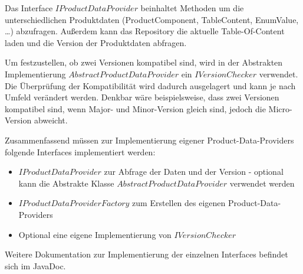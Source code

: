 \documentclass[headsepline=true, footsepline=true]{scrartcl}
\begin{document}
Das Interface $IProductDataProvider$ beinhaltet Methoden um die
unterschiedlichen Produktdaten (ProductComponent, TableContent, EnumValue, \ldots) abzufragen.
Außerdem kann das Repository die aktuelle Table-Of-Content laden und die Version
der Produktdaten abfragen.

Um festzustellen, ob zwei Versionen kompatibel sind, wird in der Abstrakten
Implementierung $AbstractProductDataProvider$ ein $IVersionChecker$ verwendet.
Die Überprüfung der Kompatibilität wird dadurch ausgelagert und kann je nach
Umfeld verändert werden. Denkbar wäre beispielsweise, dass zwei Versionen
kompatibel sind, wenn Major- und Minor-Version gleich sind, jedoch die
Micro-Version abweicht.

Zusammenfassend müssen zur Implementierung eigener Product-Data-Providers
folgende Interfaces implementiert werden:

\begin{itemize}
	\item $IProductDataProvider$ zur Abfrage der Daten und der Version - optional
	kann die Abstrakte Klasse $AbstractProductDataProvider$ verwendet werden
	\item $IProductDataProviderFactory$ zum Erstellen des eigenen
	Product-Data-Providers
	\item Optional eine eigene Implementierung von $IVersionChecker$
\end{itemize}

Weitere Dokumentation zur Implementierung der einzelnen Interfaces befindet sich
im JavaDoc.


\end{document}
